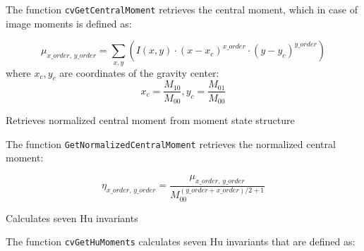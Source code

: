 The function \texttt{cvGetCentralMoment} retrieves the central moment, which in case of image moments is defined as:

\[
\mu_{x\_order, \, y\_order} = \sum_{x,y} (I(x,y) \cdot (x-x_c)^{x\_order} \cdot (y-y_c)^{y\_order})
\]
where $x_c,y_c$ are coordinates of the gravity center:
\[
x_c=\frac{M_{10}}{M_{00}}, y_c=\frac{M_{01}}{M_{00}}
\]

\label{GetNormalizedCentralMoment}

Retrieves normalized central moment from moment state structure


\begin{description}
\end{description}

The function \texttt{GetNormalizedCentralMoment} retrieves the normalized central moment:

\[
\eta_{x\_order, \, y\_order} = \frac{\mu_{x\_order, \, y\_order}}{M_{00}^{(y\_order+x\_order)/2+1}}
\]

\label{GetHuMoments}

Calculates seven Hu invariants


\begin{description}
\end{description}

The function \texttt{cvGetHuMoments} calculates seven Hu invariants that are defined as:

